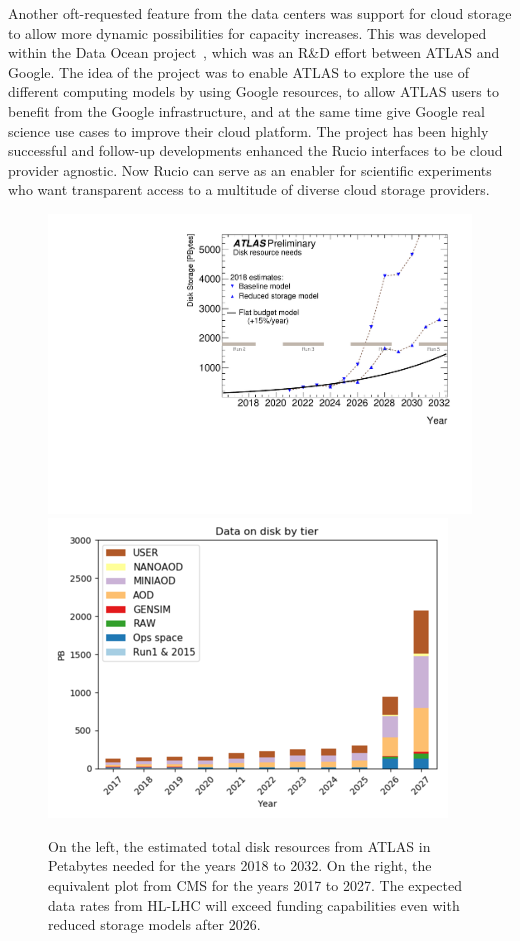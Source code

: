 \documentclass[11pt]{article}
\begin{document}
Another oft-requested feature from the data centers was support for cloud storage to allow more dynamic possibilities for capacity increases. This was developed within the Data Ocean project~\cite{dataocean}, which was an R\&D effort between ATLAS and Google. The idea of the project was to enable ATLAS to explore the use of different computing models by using Google resources, to allow ATLAS users to benefit from the Google infrastructure, and at the same time give Google real science use cases to improve their cloud platform. The project has been highly successful and follow-up developments enhanced the Rucio interfaces to be cloud provider agnostic. Now Rucio can serve as an enabler for scientific experiments who want transparent access to a multitude of diverse cloud storage providers.

\begin{figure}[t]
    \centering
    \includegraphics[width=0.49\linewidth]{figs/atlas.pdf}
    \hfill
    \includegraphics[width=0.49\linewidth]{figs/cms.png}
    \caption{On the left, the estimated total disk resources from ATLAS in Petabytes needed for the years 2018 to 2032. On the right, the equivalent plot from CMS for the years 2017 to 2027. The expected data rates from HL-LHC will exceed funding capabilities even with reduced storage models after 2026.}
    \label{fig:hllhc}
\end{figure}
\end{document}
